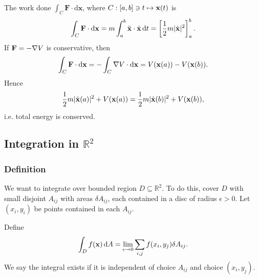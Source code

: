 \begin{example}
    The work done $ \int_{C} \mathbf{F} \cdot\mathrm{d}\mathbf{x} $, where $ C:[a,b]\ni t\mapsto {\bf x}(t) $ is 
    \[
        \int_{C} \mathbf{F} \cdot\mathrm{d}\mathbf{x}= m \int_{a}^{b} \ddot{{\bf x}}\cdot \dot{{\bf x}} \,\mathrm{d}t = \left[ \frac{1}{2}m |\dot{{\bf x}}|^2 \right]_{a}^{b}.
    \]
    If ${\bf F} = -\nabla V$ is conservative, then 
    \[
        \int_{C} \mathbf{F} \cdot\mathrm{d}\mathbf{x} = - \int_{C} \nabla V \cdot\mathrm{d}\mathbf{x} = V({\bf x}(a))-V({\bf x}(b)).
    \]
    Hence
    \[
        \frac{1}{2}m |\dot{{\bf x}}(a)|^2+V({\bf x}(a))=\frac{1}{2}m |\dot{{\bf x}}(b)|^2+V({\bf x}(b)),
    \]
    i.e. total energy is conserved.
\end{example}

\subsection{Integration in $ \mathbb{R}^{2} $}
\subsubsection*{Definition}
We want to integrate over bounded region $ D \subseteq \mathbb{R}^{2} $. To do this, cover $D$ with small disjoint $A_{ij}$ with areas $ \delta A_{ij} $, each contained in a disc of radius $ \epsilon>0 $. Let $ (x_i,y_i) $ be points contained in each $A_{ij}$.
\begin{center}
\end{center}

\begin{definition}
    Define 
    \[
        \int_{D} f({\bf x}) \,\mathrm{d}A = \lim_{\epsilon \to 0} \sum_{i,j} f(x_i,y_j) \delta A_{ij}.
    \]
    We say the integral exists if it is independent of choice $A_{ij}$ and choice $ (x_i,y_j) $.
\end{definition}

